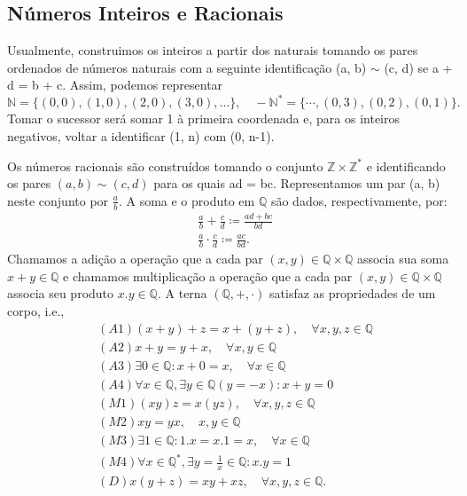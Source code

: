 \documentclass[Analysis/analysis_notes.tex]{subfiles}
\begin{document}
\subsection{N\'umeros Inteiros e Racionais}
Usualmente, construimos os inteiros a partir dos naturais tomando os pares ordenados de n\'umeros naturais
com a seguinte identifica\c c\~ao (a, b) $\mathtt{\sim}$ (c, d) se a + d = b + c. Assim, podemos representar
$$
	\mathbb{N} = \{(0, 0), (1, 0), (2, 0), (3, 0), \ldots\}, \quad -\mathbb{N}^* = \{\cdots, (0, 3), (0, 2), (0, 1)\}.
$$
Tomar o sucessor ser\'a somar 1 \`a primeira coordenada e, para os inteiros negativos, voltar a identificar (1, n) com (0, n-1).

Os n\'umeros racionais s\~ao constru\'idos tomando o conjunto $\mathbb{Z}\times{\mathbb{Z}^*}$ e identificando os pares $(a, b)\mathtt{\sim}(c, d)$
para os quais ad = bc. Representamos um par (a, b) neste conjunto por $\displaystyle \frac{a}{b}.$ A soma e o produto em $\mathbb{Q}$
s\~ao dados, respectivamente, por:
\begin{align*}
	 & \frac{a}{b} + \frac{c}{d} \coloneqq \frac{ad + bc}{bd} \\
	 & \frac{a}{b}\cdot\frac{c}{d} \coloneqq \frac{ac}{bd}.
\end{align*}
Chamamos a adi\c c\~ao a opera\c c\~ao que a cada par $(x, y)\in \mathbb{Q}\times{\mathbb{Q}}$ associa sua soma $x+y\in \mathbb{Q}$
e chamamos multiplica\c c\~ao a opera\c c\~ao que a cada par $(x, y)\in \mathbb{Q}\times \mathbb{Q}$ associa seu produto $x.y\in \mathbb{Q}.$
A terna $(\mathbb{Q}, +, \cdot)$ satisfaz as propriedades de um corpo, i.e.,
\begin{align*}
	 & (A1) (x + y) + z = x + (y + z), \quad\forall x, y, z\in \mathbb{Q}             \\
	 & (A2) x + y = y + x, \quad\forall x, y\in \mathbb{Q}                            \\
	 & (A3) \exists 0\in \mathbb{Q}: x + 0 = x, \quad\forall x\in \mathbb{Q}          \\
	 & (A4) \forall x\in \mathbb{Q}, \exists y\in \mathbb{Q} (y = -x): x + y = 0      \\
	 & (M1) (xy)z = x(yz), \quad\forall x, y, z\in \mathbb{Q}                         \\
	 & (M2) xy = yx, \quad x, y\in \mathbb{Q}                                         \\
	 & (M3) \exists 1\in \mathbb{Q}: 1.x = x.1 = x, \quad\forall x\in \mathbb{Q}      \\
	 & (M4) \forall x\in \mathbb{Q}^*, \exists y = \frac{1}{x}\in \mathbb{Q}: x.y = 1 \\
	 & (D) x(y+z) = xy + xz,\quad\forall x, y, z\in \mathbb{Q}.
\end{align*}
\end{document}

